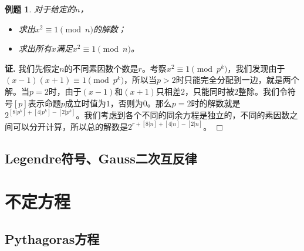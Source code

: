 \documentclass{ctexart}
\newtheorem{exmp}{例题}[section]
\renewenvironment{proof}[1][证]{\noindent \textbf{#1.} }{\hfill$\Box$}
\begin{document}
\begin{exmp}
对于给定的$n$，
\begin{itemize}
\item 求出$x^2\equiv 1\pmod{n}$的解数；
\item 求出所有$x$满足$x^2\equiv 1\pmod{n}$。
\end{itemize}
\end{exmp}
\begin{proof}
我们先假定$n$的不同素因数个数是$r$。考察$x^2\equiv 1\pmod{p^k}$，我们发现由于$(x-1)(x+1)\equiv 1\pmod{p^k}$，所以当$p>2$时只能完全分配到一边，就是两个解。当$p=2$时，由于$(x-1)$和$(x+1)$只相差$2$，只能同时被$2$整除。我们令符号$[p]$表示命题$p$成立时值为$1$，否则为$0$。那么$p=2$时的解数就是$2^{[8|p^k]+[4|p^k]-[2|p^k]}$。我们考虑到各个不同的同余方程是独立的，不同的素因数之间可以分开计算，所以总的解数是$2^{r+[8|n]+[4|n]-[2|n]}$。
\end{proof}

\subsection{Legendre符号、Gauss二次互反律}

\section{不定方程}

\subsection{Pythagoras方程}
\end{document}
